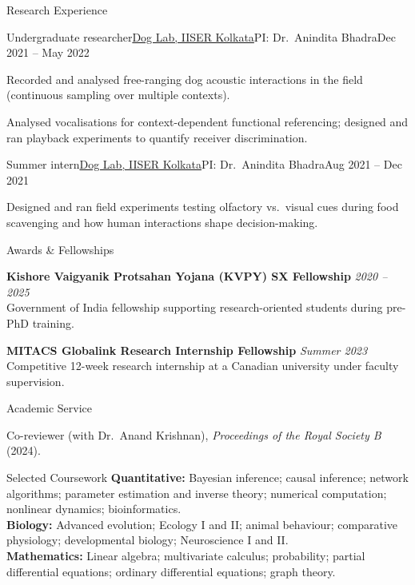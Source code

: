 \documentclass{resume}
\begin{document}
\begin{rSection}{Research Experience}
\begin{rSubsection}{Undergraduate researcher}{\href{https://sites.google.com/view/doglabiiserkolkata/home}{Dog Lab, IISER Kolkata}}{PI: Dr.\ Anindita Bhadra}{Dec 2021 -- May 2022}
\item Recorded and analysed free-ranging dog acoustic interactions in the field (continuous sampling over multiple contexts).
\item Analysed vocalisations for context-dependent functional referencing; designed and ran playback experiments to quantify receiver discrimination.
\end{rSubsection}

\begin{rSubsection}{Summer intern}{\href{https://sites.google.com/view/doglabiiserkolkata/home}{Dog Lab, IISER Kolkata}}{PI: Dr.\ Anindita Bhadra}{Aug 2021 -- Dec 2021}
\item Designed and ran field experiments testing olfactory vs.\ visual cues during food scavenging and how human interactions shape decision-making.
\end{rSubsection}
\end{rSection}

\newpage
\begin{rSection}{Awards \& Fellowships}
\item {\bf Kishore Vaigyanik Protsahan Yojana (KVPY) SX Fellowship} \hfill {\em 2020 -- 2025}\\
Government of India fellowship supporting research-oriented students during pre-PhD training.

\item {\bf MITACS Globalink Research Internship Fellowship} \hfill {\em Summer 2023}\\
Competitive 12-week research internship at a Canadian university under faculty supervision.
\par
\end{rSection}

\begin{rSection}{Academic Service}
\item Co-reviewer (with Dr.\ Anand Krishnan), \textit{Proceedings of the Royal Society B} (2024).
\end{rSection}

\begin{rSection}{Selected Coursework}
{\bf Quantitative:} Bayesian inference; causal inference; network algorithms; parameter estimation and inverse theory; numerical computation; nonlinear dynamics; bioinformatics.\\
{\bf Biology:} Advanced evolution; Ecology I and II; animal behaviour; comparative physiology; developmental biology; Neuroscience I and II.\\
{\bf Mathematics:} Linear algebra; multivariate calculus; probability; partial differential equations; ordinary differential equations; graph theory.
\par
\end{rSection}
\end{document}

